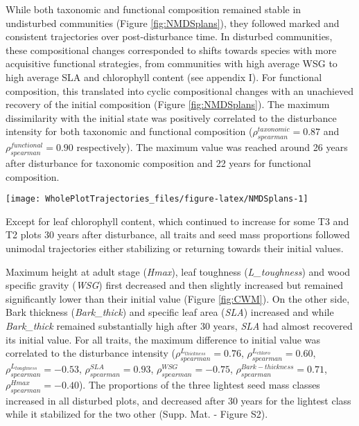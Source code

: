 \documentclass[fleqn,10pt]{ArtEcoFoG} %
\begin{document}
While both taxonomic and functional composition remained stable in
undisturbed communities (Figure \ref{fig:NMDSplans}), they followed
marked and consistent trajectories over post-\break disturbance time. In
disturbed communities, these compositional changes corresponded to
shifts towards species with more acquisitive functional strategies, from
communities with high average WSG to high average SLA and chlorophyll
content (see appendix I). For functional composition, this translated
into cyclic compositional changes with an unachieved recovery of the
initial composition (Figure \ref{fig:NMDSplans}). The maximum
dissimilarity with the initial state was positively correlated to the
disturbance intensity for both taxonomic and functional composition
(\(\rho_{spearman}^{taxonomic}=0.87\) and
\(\rho_{spearman}^{functional}=0.90\) respectively). The maximum value
was reached around 26 years after disturbance for taxonomic composition
and 22 years for functional composition.

\begin{figure*}

{\centering \texttt{[image: WholePlotTrajectories\_files/figure-latex/NMDSplans-1]} 

}

\caption{Plot trajectories in terms of flora composition (left panels \textbf{(a)} and \textbf{(c)}) and functional composition (right panels \textbf{(b)} and \textbf{(d)}) in a two-dimensional NMDS space. Lower panels (\textbf{(c)} and \textbf{(d)}) represent the euclidean distance to initial condition along the 30 sampled years. Colors are treatments: green (control), yellow (T1), orange (T2), red (T3) with shaded areas the credibility intervals.}\label{fig:NMDSplans}
\end{figure*}

Except for leaf chlorophyll content, which continued to increase for
some T3 and T2 plots 30 years after disturbance, all traits and seed
mass proportions followed unimodal trajectories either stabilizing or
returning towards their initial values.

Maximum height at adult stage (\emph{Hmax}), leaf toughness
(\emph{L\_toughness}) and wood specific gravity (\emph{WSG}) first
decreased and then slightly increased but remained significantly lower
than their initial value (Figure \ref{fig:CWM}). On the other side, Bark
thickness (\emph{Bark\_thick}) and specific leaf area (\emph{SLA})
increased and while \emph{Bark\_thick} remained substantially high after
30 years, \emph{SLA} had almost recovered its initial value. For all
traits, the maximum difference to initial value was correlated to the
disturbance intensity (\(\rho_{spearman}^{L_{thickness}}=0.76\),
\(\rho_{spearman}^{L_{chloro}}=0.60\),
\(\rho_{spearman}^{L_{toughness}}=-0.53\),
\(\rho_{spearman}^{SLA}=0.93\), \(\rho_{spearman}^{WSG}=-0.75\),
\(\rho_{spearman}^{Bark-thickness}=0.71\),
\(\rho_{spearman}^{Hmax}=-0.40\)). The proportions of the three lightest
seed mass classes increased in all disturbed plots, and decreased after
30 years for the lightest class while it stabilized for the two other
(Supp. Mat. - Figure S2).
\end{document}
